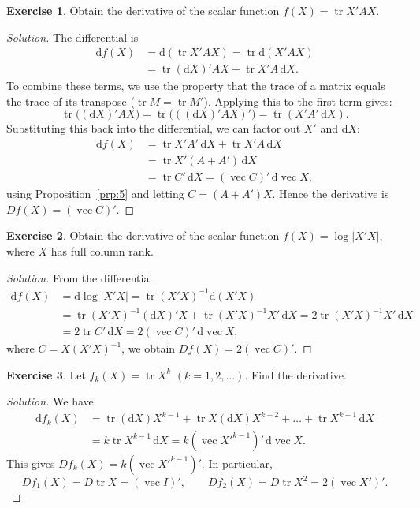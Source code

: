 \documentclass[14pt]{extarticle}
\theoremstyle{plain}
\theoremstyle{definition}
\newtheorem{exercise}{Exercise}
\theoremstyle{remark}
\newenvironment{solution}{%
  \begin{proof}[Solution]%
}{%
  \end{proof}%
}
\DeclareMathOperator{\tr}{tr}
\DeclareMathOperator{\avec}{vec}
\newcommand{\dd}{\mathrm{d}}
\begin{document}
\begin{exercise}\label{exer:19}
Obtain the derivative of the scalar function $f(X) = \tr X'AX$.
\end{exercise}

\begin{solution}
The differential is
\begin{align*}
\dd f(X) &= \dd(\tr X'AX) = \tr \dd(X'AX) \\
&= \tr(\dd X)'AX + \tr X'A\, \dd X.
\end{align*}
To combine these terms, we use the property that the trace of a matrix equals the trace of its transpose ($\tr M = \tr M'$). Applying this to the first term gives:
\[
\tr\bigl((\dd X)'AX\bigr) = \tr\bigl(((\dd X)'AX)'\bigr) = \tr(X'A'\, \dd X).
\]
Substituting this back into the differential, we can factor out $X'$ and $\dd X$:
\begin{align*}
\dd f(X) &= \tr X'A'\, \dd X + \tr X'A\, \dd X \\
&= \tr X'(A + A')\, \dd X \\
&= \tr C'\, \dd X = (\avec C)'\, \dd\avec X,
\end{align*}
using Proposition~\ref{prp:5} and letting $C = (A + A')X$.
Hence the derivative is $Df(X) = (\avec C)'$.
\end{solution}

\begin{exercise}\label{exer:20}
Obtain the derivative of the scalar function $f(X) = \log|X'X|$, where $X$ has full column rank.
\end{exercise}

\begin{solution}
From the differential
\begin{align*}
\dd f(X) &= \dd\log|X'X| = \tr(X'X)^{-1} \dd(X'X) \\
&= \tr(X'X)^{-1}(\dd X)'X + \tr(X'X)^{-1}X'\, \dd X = 2\tr(X'X)^{-1}X'\, \dd X \\
&= 2\tr C'\, \dd X = 2(\avec C)'\, \dd\avec X,
\end{align*}
where $C = X(X'X)^{-1}$, we obtain $Df(X) = 2(\avec C)'$.
\end{solution}

\begin{exercise}\label{exer:21}
Let $f_k(X) = \tr X^k$ $(k = 1, 2, \dots)$. Find the derivative.
\end{exercise}

\begin{solution}
We have
\begin{align*}
\dd f_k(X) &= \tr(\dd X)X^{k-1} + \tr X(\dd X)X^{k-2} + \dots + \tr X^{k-1}\, \dd X \\
&= k\tr X^{k-1}\, \dd X = k(\avec X'^{k-1})'\, \dd\avec X.
\end{align*}
This gives $Df_k(X) = k(\avec X'^{k-1})'$. In particular,
\[
Df_1(X) = D\tr X = (\avec I)', \qquad Df_2(X) = D\tr X^2 = 2(\avec X')'.
\]
\end{solution}
\end{document}
